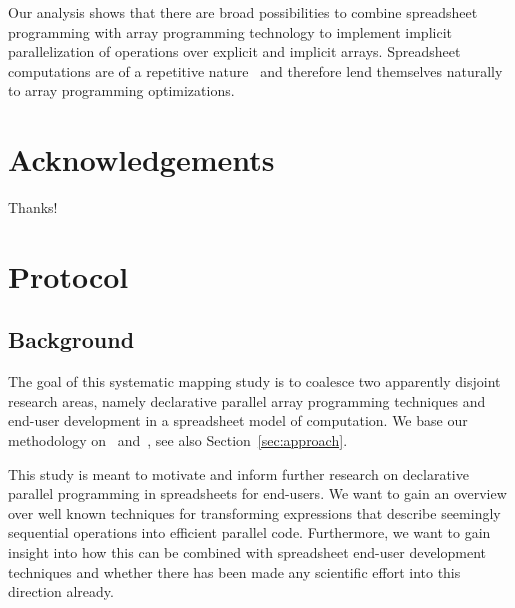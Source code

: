 \documentclass[a4paper]{article}
\begin{document}
Our analysis shows that there are broad possibilities to combine spreadsheet programming with array programming technology to implement implicit parallelization of operations over explicit and implicit arrays. Spreadsheet computations are of a repetitive nature~\cite{1173080, Benfield:2009:FFD:1668113.1668121} and therefore lend themselves naturally to array programming optimizations.

\section*{Acknowledgements}


Thanks!




\appendix

\newpage{}

\section{Protocol}
\label{sec:protocol}

\subsection{Background}
\label{sec:background}

The goal of this systematic mapping study is to coalesce two apparently disjoint research areas, namely declarative parallel array programming techniques and end-user development in a spreadsheet model of computation. We base our methodology on~\citet{keele2007guidelines}
and~\citet{petersen2008systematic}, see also Section~\ref{sec:approach}.

This study is meant to motivate and inform further research on declarative parallel programming in spreadsheets for end-users. We want to gain an overview over well known techniques for transforming expressions that describe seemingly sequential operations into efficient parallel code. Furthermore, we want to gain insight into how this can be combined with spreadsheet end-user development techniques and whether there has been made any scientific effort into this direction already.
\end{document}
